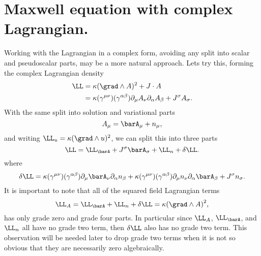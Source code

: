 \section{Maxwell equation with complex Lagrangian.}
%
Working with the Lagrangian in a complex form, avoiding any split into scalar and pseudoscalar parts, may be a more natural approach.  Lets try this, forming the complex Lagrangian density
%
\begin{equation}\label{eqn:lagrangianFieldDensity:380}
\begin{aligned}
\LL
&= \kappa (\grad \wedge A)^2 + J \cdot A \\
&= \kappa (\gamma^{\mu\nu})(\gamma^{\alpha\beta}) \partial_{\mu} A_{\nu} \partial_{\alpha} A_{\beta} + J^{\sigma} A_{\sigma}.
\end{aligned}
\end{equation}
%
With the same split into solution and variational parts
%
\begin{equation}\label{eqn:lagrangianFieldDensity:1594}
A_{\mu} = \barA_{\mu} + n_{\mu},
\end{equation}
%
and writing \(\LL_u = \kappa (\grad \wedge u)^2\), we can split this into three parts
%
\begin{equation}\label{eqn:lagrangianFieldDensity:1614}
\LL = \LL_{\barA} + J^{\sigma} \barA_{\sigma} + \LL_{n} + \delta \LL.
\end{equation}
%
where
%
\begin{equation}\label{eqn:lagrangianFieldDensity:1634}
\delta \LL =
\kappa (\gamma^{\mu\nu})(\gamma^{\alpha\beta}) \partial_{\mu} \barA_{\nu} \partial_{\alpha} n_{\beta}
+\kappa (\gamma^{\mu\nu})(\gamma^{\alpha\beta}) \partial_{\mu} n_{\nu} \partial_{\alpha} \barA_{\beta}
+ J^{\sigma} n_{\sigma}.
\end{equation}
%
It is important to note that all of the squared field Lagrangian terms
%
\begin{equation}\label{eqn:maxFieldLag:gradetwonote}
\LL_A = \LL_{\barA} + \LL_n + \delta \LL = \kappa {(\grad \wedge A)}^2,
\end{equation}
%
has only grade zero and grade four parts.  In particular since \(\LL_A\), \(\LL_{\barA}\), and \(\LL_n\) all have no grade two term, then
\(\delta \LL\) also has no grade two term.
This observation
will be needed later to drop grade two terms when it is not so obvious that they are necessarily zero algebraically.

